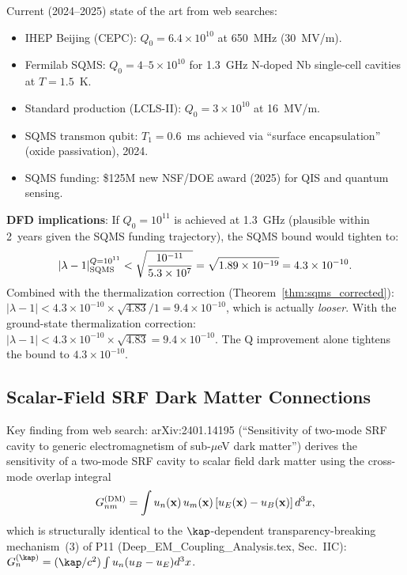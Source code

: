 \documentclass[11pt,twocolumn]{article}
\newcommand{\lam}{\lambda}
\begin{document}
Current (2024--2025) state of the art from web searches:
\begin{itemize}[nosep]
\item IHEP Beijing (CEPC): $Q_0 = 6.4\times10^{10}$ at 650~MHz (30~MV/m).
\item Fermilab SQMS: $Q_0 = 4$--$5\times10^{10}$ for 1.3~GHz N-doped Nb
single-cell cavities at $T = 1.5$~K.
\item Standard production (LCLS-II): $Q_0 = 3\times10^{10}$ at 16~MV/m.
\item SQMS transmon qubit: $T_1 = 0.6$~ms achieved via ``surface encapsulation''
(oxide passivation), 2024.
\item SQMS funding: \$125M new NSF/DOE award (2025) for QIS and quantum sensing.
\end{itemize}

\textbf{DFD implications}: If $Q_0 = 10^{11}$ is achieved at 1.3~GHz (plausible
within 2~years given the SQMS funding trajectory), the SQMS bound would tighten
to:
\begin{equation}
|\lam-1|_{\rm SQMS}^{Q=10^{11}} < \sqrt{\frac{10^{-11}}{5.3\times10^7}}
= \sqrt{1.89\times10^{-19}} = 4.3\times10^{-10}.
\end{equation}
Combined with the thermalization correction (Theorem~\ref{thm:sqms_corrected}):
$|\lam-1| < 4.3\times10^{-10}\times\sqrt{4.83}/1 = 9.4\times10^{-10}$, which is
actually \emph{looser}. With the ground-state thermalization correction:
$|\lam-1| < 4.3\times10^{-10}\times\sqrt{4.83} = 9.4\times10^{-10}$.
The Q improvement alone tightens the bound to $4.3\times10^{-10}$.

\subsection{Scalar-Field SRF Dark Matter Connections}

Key finding from web search: arXiv:2401.14195 (``Sensitivity of two-mode SRF
cavity to generic electromagnetism of sub-$\mu$eV dark matter'') derives
the sensitivity of a two-mode SRF cavity to scalar field dark matter using
the cross-mode overlap integral
\begin{equation}
G_{nm}^{(\rm DM)} = \int u_n(\mathbf{x})\,u_m(\mathbf{x})\,
[u_E(\mathbf{x}) - u_B(\mathbf{x})]\,d^3x,
\end{equation}
which is structurally identical to the $\kap$-dependent transparency-breaking
mechanism~(3) of P11 (Deep\_EM\_Coupling\_Analysis.tex, Sec.~IIC):
$G_n^{(\kap)} = (\kap/c^2)\int u_n(u_B - u_E)d^3x$.
\end{document}
